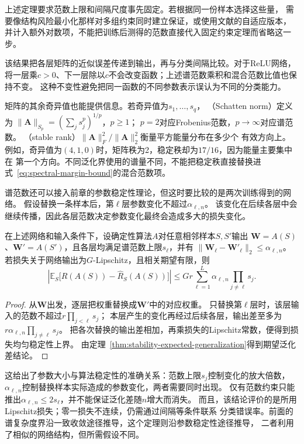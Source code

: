 上述定理要求范数上限和间隔尺度事先固定。若根据同一份样本选择这些量，
需要像结构风险最小化那样对多组约束同时建立保证，或使用文献的自适应版本，
并计入额外对数项，不能把训练后测得的范数直接代入固定约束定理而省略这一步。

该结果把各层矩阵的近似误差传递到输出，再与分类间隔比较。对于ReLU网络，
将一层乘$c>0$、下一层除以$c$不会改变函数；上述谱范数乘积和混合范数比值也保持不变。
这种不变性避免把同一函数的不同参数表示误认为不同的分类能力。

矩阵的其余奇异值也能提供信息。若奇异值为$s_1,\ldots,s_q$，
（Schatten norm）定义为
$\|\bm A\|_{S_p}=(\sum_j s_j^p)^{1/p}$，$p\geq1$；
$p=2$对应Frobenius范数，$p\to\infty$对应谱范数。
（stable rank）$\|\bm A\|_F^2/\|\bm A\|_2^2$衡量平方能量分布在多少个
有效方向上。
例如，奇异值为$(4,1,0)$时，矩阵秩为2，稳定秩却为$17/16$，因为能量主要集中在
第一个方向。不同泛化界使用的谱量不同，不能把稳定秩直接替换进
式~\eqref{eq:spectral-margin-bound}的混合范数项。

谱范数还可以接入前章的参数稳定性理论，但这时要比较的是两次训练得到的网络。
假设替换一条样本后，第$\ell$层参数变化不超过$\alpha_{\ell,n}$。
该变化在后续各层中会继续传播，因此各层范数决定参数变化最终会造成多大的损失变化。

\begin{theorem}[分层参数稳定性与期望泛化差]
\label{thm:layerwise-parameter-stability}
在上述网络和输入条件下，设确定性算法$A$对任意相邻样本$S,S'$输出
$\bm W=A(S)$、$\bm W'=A(S')$，且各层均满足谱范数上限$s_\ell$，并有
$\|\bm W_\ell-\bm W'_\ell\|_2\leq\alpha_{\ell,n}$。
若损失关于网络输出为$G$-Lipschitz，且相关期望有限，则
\[
 \left|\mathbb E_S\bigl[R(A(S))-\hat R_S(A(S))\bigr]\right|
 \leq Gr\sum_{\ell=1}^L\alpha_{\ell,n}\prod_{j\ne\ell}s_j.
\]
\end{theorem}
\begin{proof}
从$\bm W$出发，逐层把权重替换成$\bm W'$中的对应权重。
只替换第$\ell$层时，该层输入的范数不超过$r\prod_{j<\ell}s_j$；
本层产生的变化再经过后续各层，输出差至多为
$r\alpha_{\ell,n}\prod_{j\ne\ell}s_j$。
把各次替换的输出差相加，再乘损失的Lipschitz常数，便得到损失均匀稳定性上界。
由定理~\ref{thm:stability-expected-generalization}得到期望泛化差结论。
\end{proof}

这给出了参数大小与算法稳定性的准确关系：范数上限$s_j$控制变化的放大倍数，
$\alpha_{\ell,n}$控制替换样本实际造成的参数变化，两者需要同时出现。
仅有范数约束只能推出$\alpha_{\ell,n}\leq2s_\ell$，并不能保证泛化差随$n$增大而消失。
而且，该结论评价的是所用Lipschitz损失；零一损失不连续，仍需通过间隔等条件联系
分类错误率。前面的谱复杂度界沿一致收敛途径推导，这个定理则沿参数稳定性途径推导，
二者利用了相似的网络结构，但所需假设不同。

